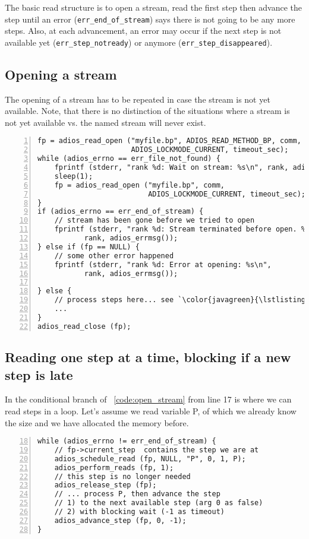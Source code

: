 The basic read structure is to open a stream, read the first step then advance the step until an error (\verb+err_end_of_stream+) says there is not going to be any more steps. Also, at each advancement, an error may occur if the next step is not available yet (\verb+err_step_notready+) or anymore (\verb+err_step_disappeared+).


\subsection{Opening a stream}
The opening of a stream has to be repeated in case the stream is not yet available. Note, that there is no distinction of the situations where a stream is not yet available vs. the named stream will never exist.

\begin{lstlisting}[numbers=left, numberstyle=\color{gray}, stepnumber=2,
                   caption={While loop to open a stream},  label=code:open_stream]
fp = adios_read_open ("myfile.bp", ADIOS_READ_METHOD_BP, comm, 
                      ADIOS_LOCKMODE_CURRENT, timeout_sec);
while (adios_errno == err_file_not_found) {
    fprintf (stderr, "rank %d: Wait on stream: %s\n", rank, adios_errmsg());
    sleep(1);
    fp = adios_read_open ("myfile.bp", comm, 
                          ADIOS_LOCKMODE_CURRENT, timeout_sec);
}
if (adios_errno == err_end_of_stream) {
    // stream has been gone before we tried to open
    fprintf (stderr, "rank %d: Stream terminated before open. %s\n",
           rank, adios_errmsg());
} else if (fp == NULL) {
    // some other error happened
    fprintf (stderr, "rank %d: Error at opening: %s\n",
           rank, adios_errmsg());

} else {
    // process steps here... see `\color{javagreen}{\lstlistingname~\ref{code:stream_stepbystep}}`
    ...
}
adios_read_close (fp);
\end{lstlisting}


\subsection{Reading one step at a time, blocking if a new step is late}
In the conditional branch of \lstlistingname~\ref{code:open_stream} from line 17 is where we can read steps in a loop. Let's assume we read variable P, of which we already know the size and we have allocated the memory before.

\begin{lstlisting}[numbers=left, numberstyle=\color{gray}, stepnumber=2,firstnumber=18,
                             caption={Read a bounding box of a variable},  label=code:stream_stepbystep]
while (adios_errno != err_end_of_stream) {
    // fp->current_step  contains the step we are at
    adios_schedule_read (fp, NULL, "P", 0, 1, P);
    adios_perform_reads (fp, 1);   
    // this step is no longer needed 
    adios_release_step (fp); 
    // ... process P, then advance the step
    // 1) to the next available step (arg 0 as false) 
    // 2) with blocking wait (-1 as timeout)
    adios_advance_step (fp, 0, -1);
}
\end{lstlisting}

